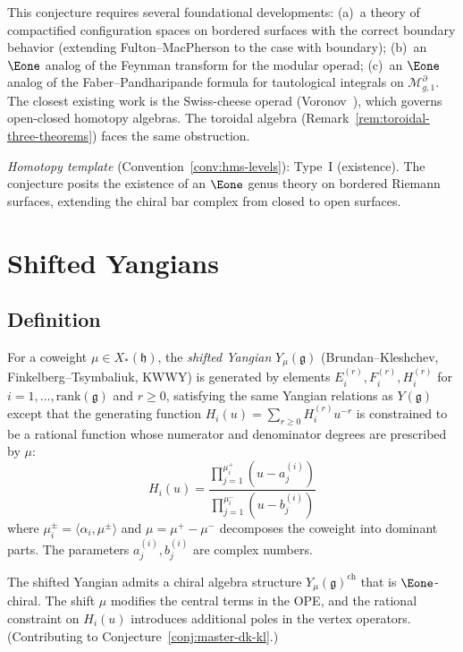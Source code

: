 \begin{remark}[Scope]\label{rem:e1-genus-scope}
This conjecture requires several foundational
developments: (a)~a theory of compactified configuration
spaces on bordered surfaces with the correct boundary
behavior (extending Fulton--MacPherson to the case
with boundary); (b)~an $\Eone$ analog of the Feynman
transform for the modular operad; (c)~an $\Eone$ analog
of the Faber--Pandharipande formula for tautological
integrals on $\mathcal{M}_{g,1}^{\partial}$.  The
closest existing work is the Swiss-cheese operad
(Voronov~\cite{Voronov99}), which governs open-closed
homotopy algebras.
The toroidal algebra
(Remark~\ref{rem:toroidal-three-theorems}) faces the
same obstruction.

\emph{Homotopy template} (Convention~\ref{conv:hms-levels}): Type~I (existence).
The conjecture posits the existence of an $\Eone$ genus theory on bordered Riemann surfaces, extending the chiral bar complex from closed to open surfaces.
\end{remark}


\section{Shifted Yangians}
\label{sec:shifted-yangians}

\subsection{Definition}

\begin{definition}\label{def:shifted-yangian}
For a coweight $\mu \in X_*(\mathfrak{h})$, the \emph{shifted Yangian} $Y_\mu(\mathfrak{g})$
(Brundan--Kleshchev, Finkelberg--Tsymbaliuk, KWWY) is generated by elements
$E_i^{(r)}, F_i^{(r)}, H_i^{(r)}$ for $i = 1, \ldots, \mathrm{rank}(\mathfrak{g})$
and $r \geq 0$, satisfying the same Yangian relations as $Y(\mathfrak{g})$ except that the
generating function $H_i(u) = \sum_{r \geq 0} H_i^{(r)} u^{-r}$ is constrained to be a rational
function whose numerator and denominator degrees are prescribed by $\mu$:
\[
H_i(u) = \frac{\prod_{j=1}^{\mu_i^+}(u - a_j^{(i)})}{\prod_{j=1}^{\mu_i^-}(u - b_j^{(i)})}
\]
where $\mu_i^\pm = \langle \alpha_i, \mu^\pm \rangle$ and $\mu = \mu^+ - \mu^-$ decomposes the coweight into dominant parts. The parameters $a_j^{(i)}, b_j^{(i)}$ are complex numbers.
\end{definition}

\begin{conjecture}\label{conj:shifted-yangian-e1}
The shifted Yangian admits a chiral algebra structure $Y_\mu(\mathfrak{g})^{\mathrm{ch}}$
that is $\Eone$-chiral.  The shift $\mu$ modifies the central terms in the OPE,
and the rational constraint on $H_i(u)$ introduces additional poles in the vertex
operators.
(Contributing to Conjecture~\ref{conj:master-dk-kl}.)
\end{conjecture}

